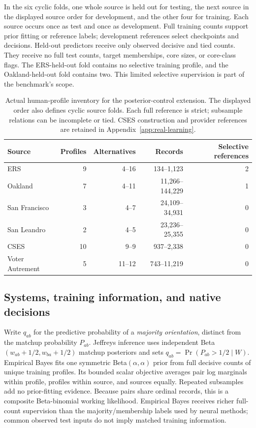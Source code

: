 In the six cyclic folds, one whole source is held out for testing, the next source in the displayed source order for development, and the other four for training. Each source occurs once as test and once as development. Full training counts support prior fitting or reference labels; development references select checkpoints and decisions. Held-out predictors receive only observed decisive and tied counts. They receive no full test counts, target memberships, core sizes, or core-class flags. The ERS-held-out fold contains no selective training profile, and the Oakland-held-out fold contains two. This limited selective supervision is part of the benchmark's scope.
\begin{table}[ht]\centering\small
\begin{tabular*}{\linewidth}{@{\extracolsep{\fill}}lrrrr@{}}\toprule
Source & Profiles & Alternatives & Records & Selective references\\\midrule
ERS & 9 & 4--16 & 134--1,123 & 2\\
Oakland & 7 & 4--11 & 11,266--144,229 & 1\\
San Francisco & 3 & 4--7 & 24,109--34,931 & 0\\
San Leandro & 2 & 4--5 & 23,236--25,355 & 0\\
CSES & 10 & 9--9 & 937--2,338 & 0\\
Voter Autrement & 5 & 11--12 & 743--11,219 & 0\\
\bottomrule\end{tabular*}
\caption{Actual human-profile inventory for the posterior-control extension. The displayed order also defines cyclic source folds. Each full reference is strict; subsample relations can be incomplete or tied. CSES construction and provider references are retained in Appendix~\ref{app:real-learning}.}\label{tab:posterior-cohort}\end{table}

\subsection{Systems, training information, and native decisions}
Write $q_{ab}$ for the predictive probability of a \emph{majority orientation}, distinct from the matchup probability $P_{ab}$. Jeffreys inference uses independent Beta$(w_{ab}+1/2,w_{ba}+1/2)$ matchup posteriors and sets $q_{ab}=\Pr(P_{ab}>1/2\mid W)$. Empirical Bayes fits one symmetric Beta$(\alpha,\alpha)$ prior from full decisive counts of unique training profiles. Its bounded scalar objective averages pair log marginals within profile, profiles within source, and sources equally. Repeated subsamples add no prior-fitting evidence. Because pairs share ordinal records, this is a composite Beta-binomial working likelihood. Empirical Bayes receives richer full-count supervision than the majority/membership labels used by neural methods; common observed test inputs do not imply matched training information.

